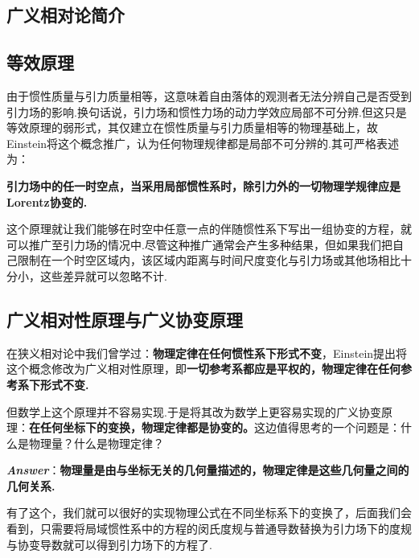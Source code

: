 \documentclass[a4paper]{book}
\newcommand{\xtjc}[1]{\textbf{\textit{#1}}}
\begin{document}
\begin{appendix}
	
\chapter{广义相对论简介}
\label{app_ex1}
\section{等效原理}
由于惯性质量与引力质量相等，这意味着自由落体的观测者无法分辨自己是否受到引力场的影响.换句话说，引力场和惯性力场的动力学效应局部不可分辨.但这只是等效原理的弱形式，其仅建立在惯性质量与引力质量相等的物理基础上，故Einstein将这个概念推广，认为任何物理规律都是局部不可分辨的.其可严格表述为：\par
\centerline{\textbf{引力场中的任一时空点，当采用局部惯性系时，除引力外的一切物理学规律应是Lorentz协变的.}}\par 
这个原理就让我们能够在时空中任意一点的伴随惯性系下写出一组协变的方程，就可以推广至引力场的情况中.尽管这种推广通常会产生多种结果，但如果我们把自己限制在一个时空区域内，该区域内距离与时间尺度变化与引力场或其他场相比十分小，这些差异就可以忽略不计.
\section{广义相对性原理与广义协变原理}
在狭义相对论中我们曾学过：\textbf{物理定律在任何惯性系下形式不变}，Einstein提出将这个概念修改为广义相对性原理，即\textbf{一切参考系都应是平权的，物理定律在任何参考系下形式不变.}\par
但数学上这个原理并不容易实现.于是将其改为数学上更容易实现的广义协变原理：\textbf{在任何坐标下的变换，物理定律都是协变的。}这边值得思考的一个问题是：什么是物理量？什么是物理定律？
\centerline{\xtjc{Answer}：\textbf{物理量是由与坐标无关的几何量描述的，物理定律是这些几何量之间的几何关系.}}\par 
有了这个，我们就可以很好的实现物理公式在不同坐标系下的变换了，后面我们会看到，只需要将局域惯性系中的方程的闵氏度规与普通导数替换为引力场下的度规与协变导数就可以得到引力场下的方程了.

\end{appendix}
\end{document}
